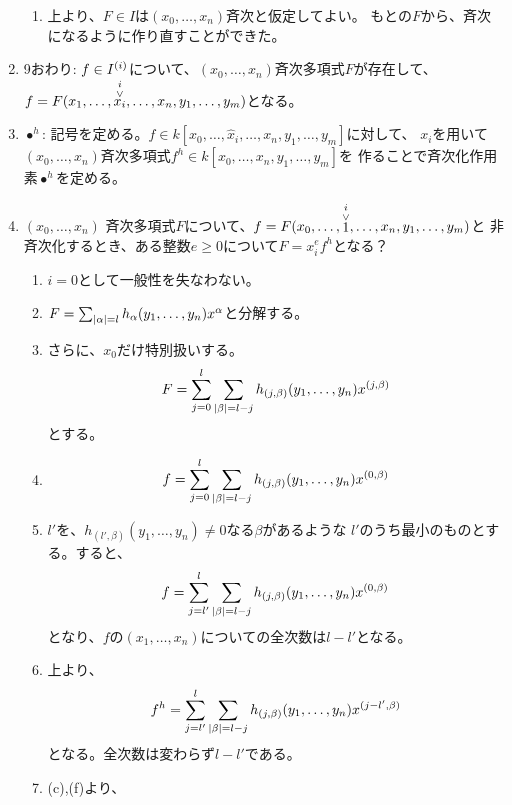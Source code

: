 \begin{myproof}
\begin{enumerate}
\begin{enumerate}
      \item 上より、$F\in I$は$(x_0,\dots,x_n)$斉次と仮定してよい。
      もとの$F$から、斉次になるように作り直すことができた。
    \end{enumerate}
    \item 9おわり: $f\in I^{(i)}$について、$(x_0,\dots,x_n)$斉次多項式$F$が存在して、
    $f=F(x_1,\dots,\stackrel{i}{\stackrel{\vee}{x_i}},\dots,x_n,y_1,\dots,y_m)$となる。
    \item $\bullet^h$:
    記号を定める。$f\in k[x_0,\dots,\hat x_i, \dots, x_n, y_1,\dots,y_m]$に対して、
    $x_i$を用いて$(x_0,\dots,x_n)$斉次多項式$f^h \in k[x_0,\dots,x_n,y_1,\dots,y_m]$を
    作ることで斉次化作用素$\bullet^h$を定める。
    \item
    $(x_0,\dots,x_n)$ 斉次多項式$F$について、$f=F(x_0,\dots,\stackrel{i}{\stackrel{\vee}{1}},\dots,x_n,y_1,\dots,y_m)$と
    非斉次化するとき、ある整数$e\ge 0$について$F=x_i^e f^h$となる？
    \begin{enumerate}
      \item $i=0$として一般性を失なわない。
      \item $F=\sum_{\left|\alpha\right|=l}h_\alpha(y_1,\dots,y_n)x^\alpha$と分解する。
      \item さらに、$x_0$だけ特別扱いする。
      \begin{align}
        F = \sum_{j=0}^l \sum_{\left|\beta\right|=l-j} h_{(j,\beta)}(y_1,\dots,y_n) x^{(j,\beta)}
      \end{align}
      とする。
      \item
      \begin{align}
        f = \sum_{j=0}^l \sum_{\left|\beta\right|=l-j} h_{(j,\beta)}(y_1,\dots,y_n) x^{(0,\beta)}
      \end{align}
      \item
      $l'$を、$h_{(l',\beta)}(y_1,\dots,y_n) \neq 0$なる$\beta$があるような
      $l'$のうち最小のものとする。すると、
      \begin{align}
        f = \sum_{j=l'}^l \sum_{\left|\beta\right|=l-j} h_{(j,\beta)}(y_1,\dots,y_n) x^{(0,\beta)}
      \end{align}
      となり、$f$の$(x_1,\dots,x_n)$についての全次数は$l-l'$となる。
      \item 上より、
      \begin{align}
        f^h = \sum_{j=l'}^l \sum_{\left|\beta\right|=l-j} h_{(j,\beta)}(y_1,\dots,y_n) x^{(j-l',\beta)}
      \end{align}
      となる。全次数は変わらず$l-l'$である。
      \item (c),(f)より、

\end{enumerate}
\end{enumerate}
\end{myproof}
